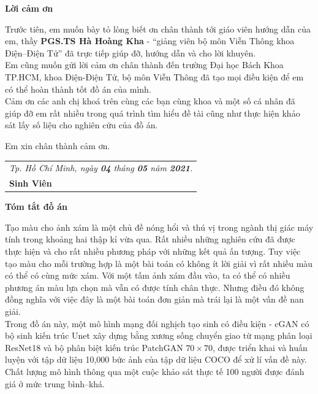 \documentclass[a4paper, 12pt]{article}
\begin{document}
\newpage

\begin{center}
\huge
\textbf{Lời cảm ơn}
\end{center}

\indent
Trước tiên, em muốn bày tỏ lòng biết ơn chân thành tới giáo viên hướng dẫn của em, thầy \textbf{PGS.TS Hà Hoàng Kha} - ``giảng viên bộ môn Viễn Thông khoa Điện--Điện Tử'' đã trực tiếp giúp đỡ, hướng dẫn và cho lời khuyên.\vspace{5pt}\\
Em cũng muốn gửi lời cảm ơn chân thành đến trường Đại học Bách Khoa TP.HCM, khoa Điện-Điện Tử, bộ môn Viễn Thông đã tạo mọi điều kiện để em có thể hoàn thành tốt đồ án của mình.\vspace{5pt}\\
Cảm ơn các anh chị khoá trên cùng các bạn cùng khoa và một số cá nhân đã giúp đỡ em rất nhiều trong quá trình tìm hiểu đề tài cũng như thực hiện khảo sát lấy số liệu cho nghiên cứu của đồ án.\vspace{5pt}

Em xin chân thành cảm ơn.\vspace{20pt}\\

\hfill
\begin{tabular}{l@{}}
\textit{Tp. Hồ Chí Minh, ngày \textbf{04} tháng \textbf{05} năm \textbf{2021}.}\vspace{10pt}\\
\hspace{3cm}\textbf{Sinh Viên}
\end{tabular}

\newpage

\begin{center}
\huge
\textbf{Tóm tắt đồ án}
\end{center}

\indent
Tạo màu cho ảnh xám là một chủ đề nóng hổi và thú vị trong ngành thị giác máy tính trong khoảng hai thập kỉ vừa qua. Rất nhiều những nghiên cứu đã được thực hiện và cho rất nhiều phương pháp với những kết quả ấn tượng. Tuy việc tạo màu cho mỗi trường hợp là một bài toán có không ít lời giải vì rất nhiều màu có thể có cùng mức xám. Với một tấm ảnh xám đầu vào, ta có thể có nhiều phương án màu lựa chọn mà vẫn có được tính chân thực. Nhưng điều đó không đồng nghĩa với việc đây là một bài toán đơn giản mà trái lại là một vấn đề nan giải.\vspace{5pt}\\
Trong đồ án này, một mô hình mạng đối nghịch tạo sinh có điều kiện - cGAN có bộ sinh kiến trúc Unet xây dựng bằng xương sống chuyển giao từ mạng phân loại ResNet18 và bộ phân biệt kiến trúc PatchGAN $70\times 70$, được triển khai và huấn luyện với tập dữ liệu 10,000 bức ảnh của tập dữ liệu COCO để xử lí vấn đề này. Chất lượng mô hình thông qua một cuộc khảo sát thực tế 100 người được đánh giá ở mức trung bình--khá.
\end{document}

